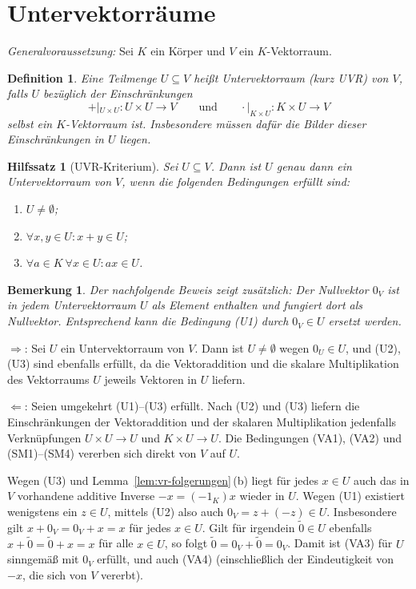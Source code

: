 \documentclass[a4paper]{article}
\makeatletter
\theoremstyle{kurzskript}
\newtheorem{definition}[satz]{Definition}
\newtheorem{hilfssatz}[satz]{Hilfssatz}
\newtheorem*{bem}{Bemerkung}
\renewenvironment{proof}[1][\proofname]{\par\pushQED{\qed}%
  \normalfont\topsep\medskipamount\relax
  \trivlist\item[\hskip\labelsep\bfseries #1\@addpunct{.}]\ignorespaces}%
  {\popQED\endtrivlist\@endpefalse}
\renewcommand{\proofname}{Beweis}
\makeatother
\begin{document}
\section{Untervektorräume}

\emph{Generalvoraussetzung:} Sei $K$ ein Körper und $V$ ein $K$-Vektorraum.

\begin{definition}
Eine Teilmenge $U \subseteq V$ heißt \emph{Untervektorraum} (kurz \emph{UVR}) von $V$, falls $U$ bezüglich der Einschränkungen
\[
  +|_{U \times U}\colon U \times U \to V \qquad\text{und}\qquad \cdot|_{K \times U}\colon K \times U \to V
\]
selbst ein $K$-Vektorraum ist. Insbesondere müssen dafür die Bilder dieser Einschränkungen in $U$ liegen.
\end{definition}

\begin{hilfssatz}[UVR-Kriterium]\label{hs:uvr}
Sei $U \subseteq V$. Dann ist $U$ genau dann ein Untervektorraum von $V$, wenn die folgenden Bedingungen erfüllt sind:
\begin{enumerate}[label=(\textup{U\arabic*}),leftmargin=3.2em]
  \item $U \neq \emptyset$;
  \item $\forall x, y \in U\colon x + y \in U$;
  \item $\forall a \in K\ \forall x \in U\colon a x \in U$.
\end{enumerate}
\end{hilfssatz}

\begin{bem}
Der nachfolgende Beweis zeigt zusätzlich: Der Nullvektor $0_V$ ist in jedem Untervektorraum $U$ als Element enthalten und fungiert dort als Nullvektor. Entsprechend kann die Bedingung (U1) durch $0_V \in U$ ersetzt werden.
\end{bem}

\begin{proof}
\glqq$\Rightarrow$\grqq: Sei $U$ ein Untervektorraum von $V$. Dann ist $U \neq \emptyset$ wegen $0_U \in U$, und (U2), (U3) sind ebenfalls erfüllt, da die Vektoraddition und die skalare Multiplikation des Vektorraums $U$ jeweils Vektoren in $U$ liefern.

\glqq$\Leftarrow$\grqq: Seien umgekehrt (U1)--(U3) erfüllt. Nach (U2) und (U3) liefern die Einschränkungen der Vektoraddition und der skalaren Multiplikation jedenfalls Verknüpfungen $U \times U \to U$ und $K \times U \to U$. Die Bedingungen (VA1), (VA2) und (SM1)--(SM4) vererben sich direkt von $V$ auf $U$.

Wegen (U3) und Lemma~\ref{lem:vr-folgerungen}\,(b) liegt für jedes $x \in U$ auch das in $V$ vorhandene additive Inverse $-x = (-1_K)x$ wieder in $U$. Wegen (U1) existiert wenigstens ein $z \in U$, mittels (U2) also auch $0_V = z + (-z) \in U$. Insbesondere gilt $x + 0_V = 0_V + x = x$ für jedes $x \in U$. Gilt für irgendein $\tilde 0 \in U$ ebenfalls $x + \tilde 0 = \tilde 0 + x = x$ für alle $x \in U$, so folgt $\tilde 0 = 0_V + \tilde 0 = 0_V$. Damit ist (VA3) für $U$ sinngemäß mit $0_V$ erfüllt, und auch (VA4) (einschließlich der Eindeutigkeit von $-x$, die sich von $V$ vererbt).
\end{proof}
\end{document}
